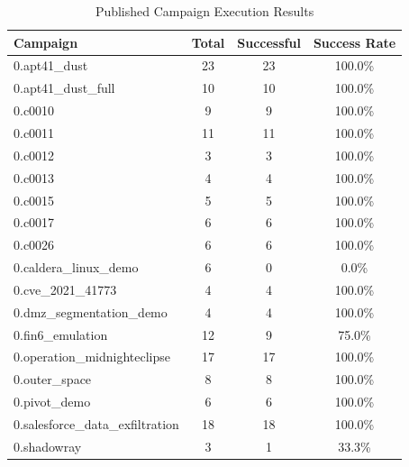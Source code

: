 \begin{table}[htbp]
\centering
\caption{Published Campaign Execution Results}
\label{tab:execution}
\begin{tabular}{lccc}
\toprule
Campaign & Total & Successful & Success Rate \\
\midrule
0.apt41_dust & 23 & 23 & 100.0\% \\
0.apt41_dust_full & 10 & 10 & 100.0\% \\
0.c0010 & 9 & 9 & 100.0\% \\
0.c0011 & 11 & 11 & 100.0\% \\
0.c0012 & 3 & 3 & 100.0\% \\
0.c0013 & 4 & 4 & 100.0\% \\
0.c0015 & 5 & 5 & 100.0\% \\
0.c0017 & 6 & 6 & 100.0\% \\
0.c0026 & 6 & 6 & 100.0\% \\
0.caldera_linux_demo & 6 & 0 & 0.0\% \\
0.cve_2021_41773 & 4 & 4 & 100.0\% \\
0.dmz_segmentation_demo & 4 & 4 & 100.0\% \\
0.fin6_emulation & 12 & 9 & 75.0\% \\
0.operation_midnighteclipse & 17 & 17 & 100.0\% \\
0.outer_space & 8 & 8 & 100.0\% \\
0.pivot_demo & 6 & 6 & 100.0\% \\
0.salesforce_data_exfiltration & 18 & 18 & 100.0\% \\
0.shadowray & 3 & 1 & 33.3\% \\
\bottomrule
\end{tabular}
\end{table}
